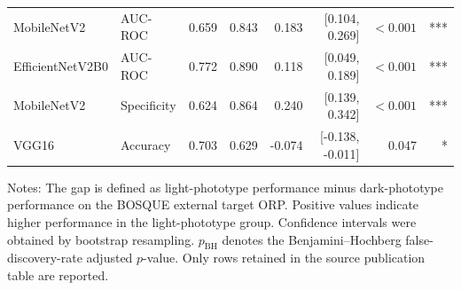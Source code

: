 \begin{table}[h!]
\begin{tabular}{llrrrrrr}
MobileNetV2 & AUC-ROC & 0.659 & 0.843 & 0.183 & [0.104, 0.269] & $<0.001$ & *** \\
EfficientNetV2B0 & AUC-ROC & 0.772 & 0.890 & 0.118 & [0.049, 0.189] & $<0.001$ & *** \\
MobileNetV2 & Specificity & 0.624 & 0.864 & 0.240 & [0.139, 0.342] & $<0.001$ & *** \\
VGG16 & Accuracy & 0.703 & 0.629 & -0.074 & [-0.138, -0.011] & 0.047 & * \\
\bottomrule
\end{tabular}
\begin{flushleft}
\footnotesize
Notes: The gap is defined as light-phototype performance minus dark-phototype performance on the BOSQUE external target ORP. Positive values indicate higher performance in the light-phototype group. Confidence intervals were obtained by bootstrap resampling. $p_{\mathrm{BH}}$ denotes the Benjamini--Hochberg false-discovery-rate adjusted $p$-value. Only rows retained in the source publication table are reported.
\end{flushleft}
\end{table}
